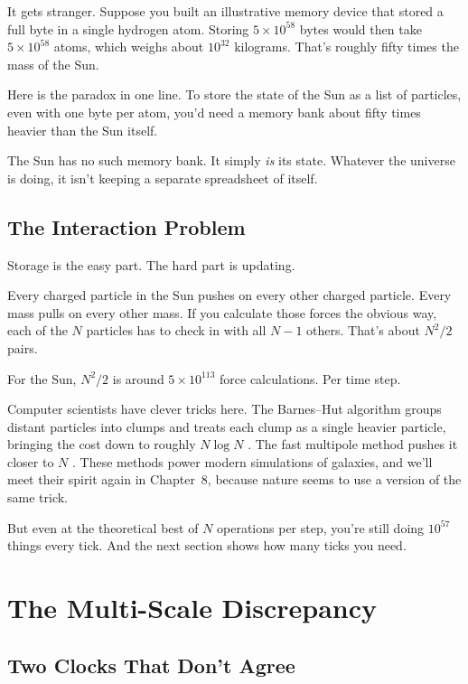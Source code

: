 It gets stranger. Suppose you built an illustrative memory device that stored a full byte in a single hydrogen atom. Storing \(5 \times 10^{58}\) bytes would then take \(5 \times 10^{58}\) atoms, which weighs about \(10^{32}\) kilograms. That's roughly fifty times the mass of the Sun.

\begin{examplebox}
Here is the paradox in one line. To store the state of the Sun as a list of particles, even with one byte per atom, you'd need a memory bank about fifty times heavier than the Sun itself.

The Sun has no such memory bank. It simply \emph{is} its state. Whatever the universe is doing, it isn't keeping a separate spreadsheet of itself.
\end{examplebox}

\subsection{The Interaction Problem}

Storage is the easy part. The hard part is updating.

Every charged particle in the Sun pushes on every other charged particle. Every mass pulls on every other mass. If you calculate those forces the obvious way, each of the \(N\) particles has to check in with all \(N-1\) others. That's about \(N^2/2\) pairs.

For the Sun, \(N^2/2\) is around \(5 \times 10^{113}\) force calculations. Per time step.

Computer scientists have clever tricks here. The Barnes--Hut algorithm groups distant particles into clumps and treats each clump as a single heavier particle, bringing the cost down to roughly \(N \log N\) \cite{barneshut1986}. The fast multipole method pushes it closer to \(N\) \cite{greengard1987}. These methods power modern simulations of galaxies, and we'll meet their spirit again in Chapter~8, because nature seems to use a version of the same trick.

But even at the theoretical best of \(N\) operations per step, you're still doing \(10^{57}\) things every tick. And the next section shows how many ticks you need.

\section{The Multi-Scale Discrepancy}

\subsection{Two Clocks That Don't Agree}

